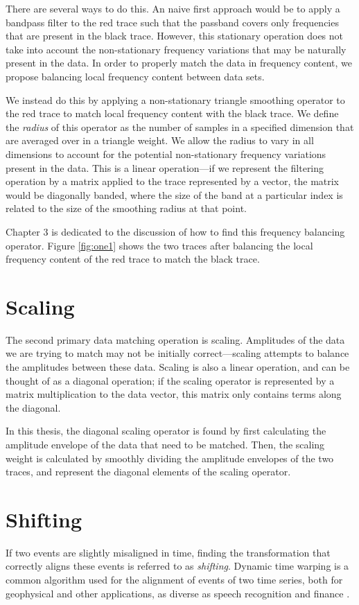 There are several ways to do this.
An naive first approach would be to apply a bandpass filter to the red trace such that the passband covers only frequencies that are present in the black trace.
However, this stationary operation does not take into account the non-stationary frequency variations that may be naturally present in the data.
In order to properly match the data in frequency content, we propose balancing local frequency content between data sets.

We instead do this by applying a non-stationary triangle smoothing operator to the red trace to match local frequency content with the black trace.
We define the {\em radius} of this operator as the number of samples in a specified dimension that are averaged over in a triangle weight.
We allow the radius to vary in all dimensions to account for the potential non-stationary frequency variations present in the data.
This is a linear operation---if we represent the filtering operation by a matrix applied to the trace represented by a vector, the matrix would be diagonally banded, where the size of the band at a particular index is related to the size of the smoothing radius at that point.

Chapter 3 is dedicated to the discussion of how to find this frequency balancing operator.
Figure \ref{fig:one1} shows the two traces after balancing the local frequency content of the red trace to match the black trace.


\section{Scaling}
The second primary data matching operation is scaling. 
Amplitudes of the data we are trying to match may not be initially correct---scaling attempts to balance the amplitudes between these data.
Scaling is also a linear operation, and can be thought of as a diagonal operation; if the scaling operator is represented by a matrix multiplication to the data vector, this matrix only contains terms along the diagonal.

In this thesis, the diagonal scaling operator is found by first calculating the amplitude envelope of the data that need to be matched.
Then, the scaling weight is calculated by smoothly dividing the amplitude envelopes of the two traces, and represent the diagonal elements of the scaling operator.

\section{Shifting}
If two events are slightly misaligned in time, finding the transformation that correctly aligns these events is referred to as {\em shifting}.
Dynamic time warping is a common algorithm used for the alignment of events of two time series, both for geophysical and other applications, as diverse as speech recognition and finance \cite[]{herrera2012,hale2013,dtw,finance}.

